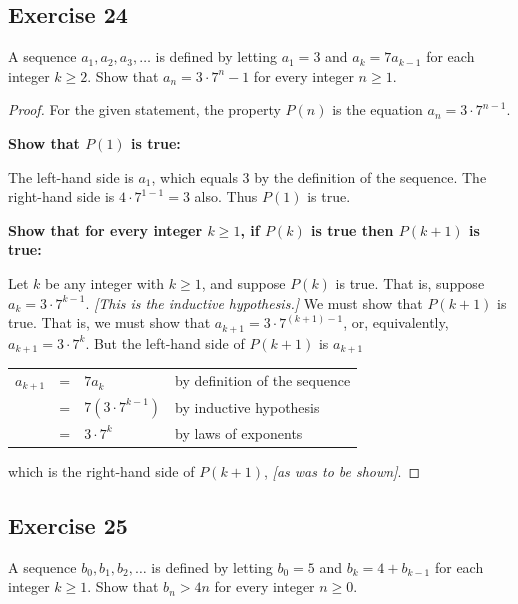 \documentclass[14pt]{extarticle}
\newcommand{\cy}{\color{cyan}}
\begin{document}
\subsection{Exercise 24}
A sequence $a_1, a_2, a_3, \ldots$ is defined by letting $a_1 = 3$ and $a_k = 7a_{k-1}$ for each integer $k \geq 2$. Show that $a_n = 3\cdot 7^n - 1$ for every integer $n \geq 1$.

\begin{proof}
For the given statement, the property $P(n)$ is the equation $a_n = 3 \cdot 7^{n - 1}$. 

{\bf Show that $P(1)$ is true:} 

The left-hand side is $a_1$, which equals 3 by the definition of the sequence. The right-hand side is $4 \cdot 7^{1 - 1} = 3$ also. Thus $P(1)$ is true. 

{\bf Show that for every integer $k \geq 1$, if $P(k)$ is true then $P(k + 1)$ is true:} 

Let $k$ be any integer with $k \geq 1$, and suppose $P(k)$ is true. That is, suppose $a_k = 3 \cdot 7^{k - 1}$. {\it [This is the inductive hypothesis.]} We must show that $P(k + 1)$ is true. That is, we must show that $a_{k + 1} = 3 \cdot 7^{(k + 1) - 1}$, or, equivalently, $a_{k + 1} = 3 \cdot 7^k$. But the left-hand side of $P(k+1)$ is $a_{k+1}$

\begin{center}
\begin{tabular}{rlll}
$a_{k+1}$ & = & $7a_k$ & {\cy by definition of the sequence} \\
& = & $7(3 \cdot 7^{k - 1})$ & {\cy by inductive hypothesis} \\
& = & $3 \cdot 7^k$ & {\cy by laws of exponents} \\
\end{tabular}
\end{center}

which is the right-hand side of $P(k + 1)$, {\it [as was to be shown]}.
\end{proof}

\subsection{Exercise 25}
A sequence $b_0, b_1, b_2, \ldots$ is defined by letting
$b_0 = 5$ and $b_k = 4 + b_{k-1}$ for each integer $k \geq 1$. Show that $b_n > 4n$ for every integer $n \geq 0$.
\end{document}
